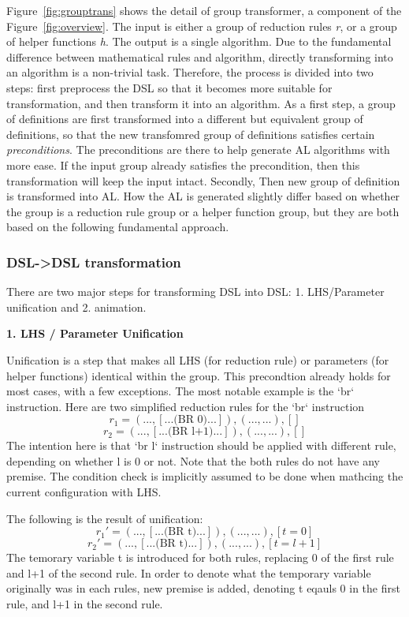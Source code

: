 Figure~\ref{fig:grouptrans} shows the detail of group transformer, a component of the Figure~\ref{fig:overview}.
The input is either a group of reduction rules \textit{r}, or a group of helper functions \textit{h}.
The output is a single algorithm.
Due to the fundamental difference between mathematical rules and algorithm,
directly transforming into an algorithm is a non-trivial task.
Therefore, the process is divided into two steps: first preprocess the DSL so that
it becomes more suitable for transformation, and then transform it into an algorithm.
As a first step, a group of definitions are first transformed into a different but equivalent group of definitions,
so that the new transfomred group of definitions satisfies certain \textit{preconditions}.
The preconditions are there to help generate AL algorithms with more ease.
If the input group already satisfies the precondition, then this transformation will keep the input intact.
Secondly, Then new group of definition is transformed into AL.
How the AL is generated slightly differ based on whether the group is a reduction rule group or a helper function
group, but they are both based on the following fundamental approach.

\subsubsection{DSL->DSL transformation}

There are two major steps for transforming DSL into DSL: 1. LHS/Parameter unification and
2. animation.

\textbf{1. LHS / Parameter Unification}

Unification is a step that makes all LHS (for reduction rule) or parameters
(for helper functions) identical within the group.
This precondtion already holds for most cases, with a few exceptions.
The most notable example is the `br` instruction.
Here are two simplified reduction rules for the `br` instruction
\[
r_1 = (..., [... \text{(BR 0)} ...]),  (..., ...), []
\]
\[
r_2 = (..., [... \text{(BR l+1)} ...]),  (..., ...), []
\]
The intention here is that `br l` instruction should be applied with different rule,
depending on whether l is 0 or not.
Note that the both rules do not have any premise. The condition check is implicitly assumed to be
done when mathcing the current configuration with LHS.

The following is the result of unification:
\[
r_1' = (..., [... \text{(BR t)} ...]),  (..., ...), [t = 0]
\]
\[
r_2' = (..., [... \text{(BR t)} ...]),  (..., ...), [t = l + 1]
\]
The temorary variable t is introduced for both rules, replacing 0 of the first rule and
l+1 of the second rule. In order to denote what the temporary variable originally was
in each rules, new premise is added, denoting t eqauls 0 in the first rule, and l+1 in the second rule.

